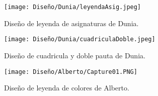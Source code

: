 \begin{figure}[ht!]
  \centering
\texttt{[image: Diseño/Dunia/leyendaAsig.jpeg]}
  \caption{Diseño de leyenda de asignaturas de Dunia.}
  \label{dunia8}
\end{figure}

\begin{figure}[ht!]
  \centering
\texttt{[image: Diseño/Dunia/cuadriculaDoble.jpeg]}
  \caption{Diseño de cuadricula y doble pauta de Dunia.}
  
  \label{dunia9}
\end{figure}



\begin{figure}[ht!]
  \centering
\texttt{[image: Diseño/Alberto/Capture01.PNG]}
  \caption{Diseño de leyenda de colores de Alberto.}
  
  
\end{figure}

